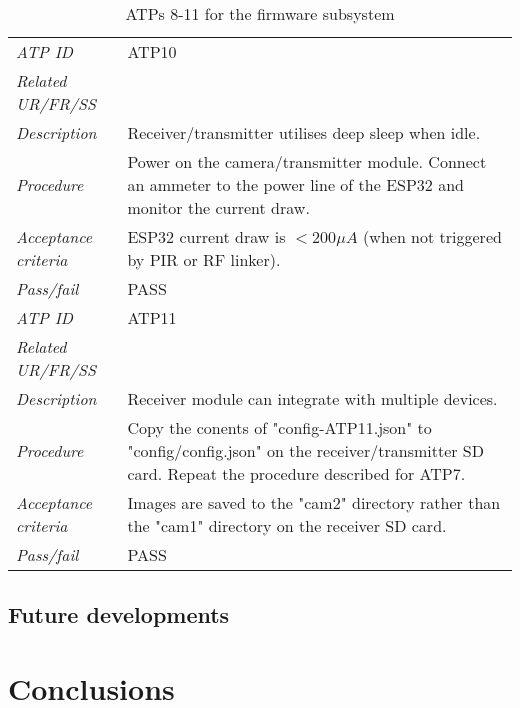 \documentclass[class=report,11pt,crop=false]{standalone}
\begin{document}
\begin{table}[!ht]
\begin{scriptsize}
\begin{tabularx}{\textwidth}{|p{} X|}
        \textit{ATP ID} & ATP10\\
        \textit{Related UR/FR/SS} & \\
        \textit{Description} & Receiver/transmitter utilises deep sleep when idle.\\
        \textit{Procedure} & Power on the camera/transmitter module. Connect an ammeter to the power line of the ESP32 and monitor the current draw. \\
        \textit{Acceptance criteria} & ESP32 current draw is $ < 200 \mu A $ (when not triggered by PIR or RF linker).\\ 
        \textit{Pass/fail} & PASS\\ \hline

        \textit{ATP ID} & ATP11\\
        \textit{Related UR/FR/SS} & \\
        \textit{Description} & Receiver module can integrate with multiple devices.\\
        \textit{Procedure} & Copy the conents of "config-ATP11.json" to "config/config.json" on the receiver/transmitter SD card. Repeat the procedure described for ATP7. \\
        \textit{Acceptance criteria} & Images are saved to the "cam2" directory rather than the "cam1" directory on the receiver SD card.\\ 
        \textit{Pass/fail} & PASS\\ \hline
        

    \end{tabularx}
    \end{scriptsize}
    \caption{ATPs 8-11 for the firmware subsystem}
    \label{tab:firmware-atps2}
\end{table}

\subsection{Future developments}


\section{Conclusions}



\ifstandalone

\printnoidxglossary[type=\acronymtype,nonumberlist]
\fi
\end{document}
